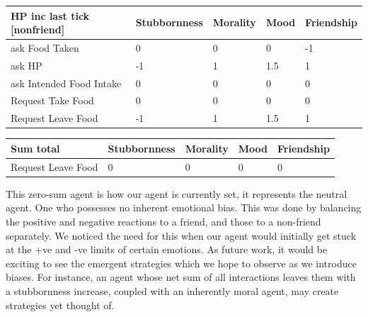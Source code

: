 \begin{table}[htb]
    \centering
    \begin{tabular}{@{}lllll@{}}
    \toprule
    HP inc last tick [nonfriend]    & Stubbornness      & Morality         & Mood             & Friendship     \\ \midrule
    ask Food Taken                  & 0                 & 0                & 0                & -1             \\
    ask HP                          & -1                & 1                & 1.5              & 1              \\
    ask Intended Food Intake        & 0                 & 0                & 0                & 0              \\
    Request Take Food               & 0                 & 0                & 0                & 0              \\
    Request Leave Food              & -1                & 1                & 1.5              & 1              \\ \bottomrule
    \end{tabular}
\end{table}
\begin{table}[htb]
    \centering
    \begin{tabular}{@{}lllll@{}}
    \toprule
    Sum total                       & Stubbornness      & Morality         & Mood             & Friendship     \\ \midrule
    Request Leave Food              & 0                 & 0                & 0                & 0              \\ \bottomrule
    \end{tabular}
\end{table}
This zero-sum agent is how our agent is currently set, it represents the neutral agent. One who possesses no inherent emotional bias. This was done by balancing the positive and negative reactions to a friend, and those to a non-friend separately. We noticed the need for this when our agent would initially get stuck at the +ve and -ve limits of certain emotions. As future work, it would be exciting to see the emergent strategies which we hope to observe as we introduce biases. For instance, an agent whose net sum of all interactions leaves them with a stubbornness increase, coupled with an inherently moral agent, may create strategies yet thought of. 

